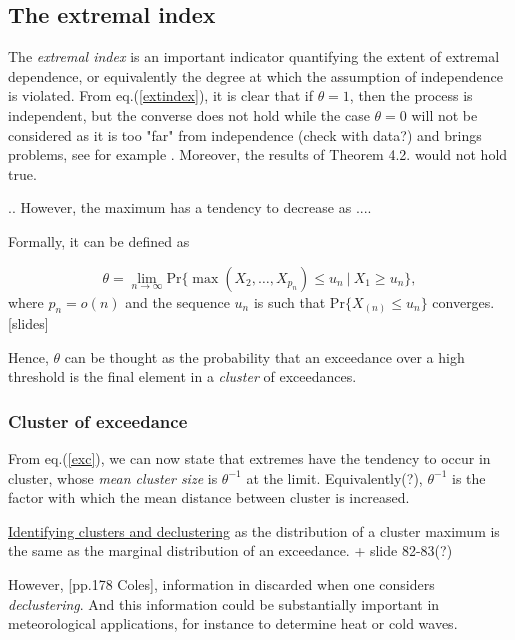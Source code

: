 \documentclass[11pt,a4paper,openany ]{book}
\begin{document}
\subsection{The extremal index}
The \emph{extremal index} is an important indicator quantifying the extent of extremal dependence, or equivalently the degree at which the assumption of independence is violated. From eq.(\ref{extindex}), it is clear that if  $\theta=1$, then the process is independent, but the converse does not hold while the case $\theta= 0$ will not be considered as it is too "far" from independence (check with data?) and brings problems, see for example \citet[pp.379-380]{beirlant_statistics_2006}. Moreover, the results of Theorem 4.2. would not hold true.

.. However, the maximum has a tendency to decrease as .... \cite[pp.96]{coles_introduction_2001}

Formally, it can be defined
as 

\begin{equation}\label{exc}
\theta=\displaystyle{\lim_{n \to \infty}}\text{Pr}\big\{\max(X_2,\dots,X_{p_n})\leq u_n\ | \ X_1\geq u_n\big\},
\end{equation}
where $p_n=o(n)$ and the sequence $u_n$ is such that Pr$\big\{X_{(n)} \leq u_n\big\}$ converges. \cite{coles_introduction_2001}[slides]

Hence, $\theta$ can be thought as the probability that an exceedance over a high threshold is the final element in a \emph{cluster }of exceedances.

\subsubsection*{Cluster of exceedance} From eq.(\ref{exc}), we can now state that extremes have the tendency to occur in cluster, whose \emph{mean cluster size} is $\theta^{-1}$ at the limit. Equivalently(?), $\theta^{-1}$ is the factor with which the mean distance between cluster is increased.

\underline{Identifying clusters and declustering} as the distribution of a cluster maximum is the same as the marginal distribution of an
exceedance.
+ slide 82-83(?)

However, [pp.178 Coles], information in discarded when one considers \emph{declustering}. And this information could be substantially important in meteorological applications, for instance to determine heat or cold waves.
\end{document}
